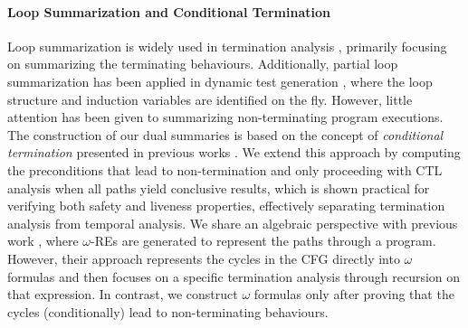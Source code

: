 \paragraph*{\textbf{Loop Summarization and Conditional Termination}}
Loop summarization is widely used in termination analysis \cite{DBLP:journals/toplas/ChenDKSW18,DBLP:conf/tacas/TsitovichSWK11,DBLP:journals/tse/XieCZLLL19}, primarily focusing on summarizing the terminating behaviours. Additionally, partial loop summarization has been applied in dynamic test generation \cite{DBLP:conf/issta/GodefroidL11}, where the loop structure and induction variables are identified on the fly. 
However, little attention has been given to summarizing non-terminating program executions. 
The construction of our dual summaries is based on the concept of \emph{conditional termination} presented in previous works \cite{DBLP:conf/cav/CookGLRS08,DBLP:conf/tacas/BorrallerasBLOR17,DBLP:conf/pldi/0001K21}. We extend this approach by computing the preconditions that lead to non-termination and only proceeding with CTL analysis when all paths yield conclusive results, which is shown practical for verifying both safety and liveness properties, effectively separating termination analysis from temporal analysis. 
We share an algebraic perspective with previous work \cite{DBLP:conf/pldi/0001K21}, where $\omega$-REs are generated to represent the paths through a program. However, their approach represents the cycles in the CFG directly into $\omega$ formulas and then focuses on a specific termination analysis through recursion on that expression. In contrast, we construct $\omega$ formulas only after proving that the cycles (conditionally) lead to non-terminating behaviours. 













